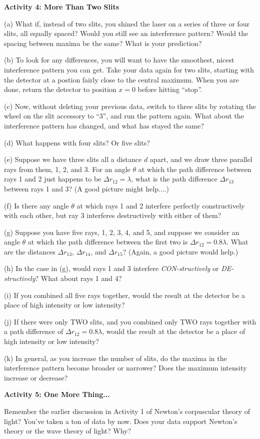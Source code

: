 \pagebreak[2]
\textbf{Activity 4: More Than Two Slits}

(a) What if, instead of two slits, you shined the laser on a series of three or four slits, all equally spaced?  Would you still see an interference pattern?  Would the spacing between maxima be the same?  What is your prediction?
\answerspace{1in}

(b) To look for any differences, you will want to have the smoothest, nicest interference pattern you can get.  Take your data again for two slits, starting with the detector at a postion fairly close to the central maximum.  When you are done, return the detector to position $x=0$ before hitting ``stop''.  

(c) Now, without deleting your previous data, switch to three slits by rotating the wheel on the slit accessory 
to ``3'', and run the pattern again.  What about the interference pattern has changed, and what has stayed the same?
\answerspace{0.8in}

(d) What happens with four slits?  Or five slits?
\answerspace{0.8in}

(e) Suppose we have three slits all a distance $d$ apart, and we draw three parallel rays from them, 1, 2, and 3.  For an angle $\theta$ at which the path difference between rays 1 and 2 just happens to be $\Delta r_{12} = \lambda$, what is the path difference $\Delta r_{13}$ between rays 1 and 3?  (A good picture might help....)
\answerspace{1.5in}

(f) Is there any angle $\theta$ at which rays 1 and 2 interfere perfectly constructively with each other,  but ray 3 interferes destructively with either of them?
\answerspace{0.4in}

\pagebreak[2]
(g) Suppose you have five rays, 1, 2, 3, 4, and 5, and suppose we consider an angle $\theta$ at which the path difference between the first two is $\Delta r_{12} = 0.8\lambda$.  What are the distances $\Delta r_{13}$, $\Delta r_{14}$, and $\Delta r_{15}$?  (Again, a good picture would help.)
\answerspace{2.5in}

(h) In the case in (g), would rays 1 and 3 interfere \textit{CON-structively} or \textit{DE-structively}?  What about rays 1 and 4?
\answerspace{0.8in}

(i) If you combined all five rays together, would the result at the detector be a place of high intensity or low intensity? 
\answerspace{0.6in}

(j) If there were only TWO slits, and you combined only TWO rays together with a path difference of $\Delta r_{12} = 0.8\lambda$, would the result at the detector be a place of high intensity or low intensity? 
\answerspace{0.6in}

(k) In general, as you increase the number of slits, do the maxima in the interference pattern become broader or narrower?  Does the maximum intensity increase or decrease?
\answerspace{0.6in}

\textbf{Activity 5: One More Thing...}

Remember the earlier discussion in Activity 1 of Newton's corpuscular theory of
light? You've taken a ton of data by now.  Does your data support Newton's theory or the wave theory of light?
Why?
\answerspace{1.0in}
